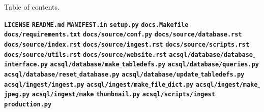 \documentclass[10pt,journal,compsoc]{IEEEtran}
\begin{document}
Table of contents.

\noindent\textbf{\texttt{LICENSE}}\lstset{style=code}
\textbf{\texttt{README.md}}\lstset{style=code}
\textbf{\texttt{MANIFEST.in}}\lstset{style=code}
\textbf{\texttt{setup.py}}\lstset{style=code}
\textbf{\texttt{docs.Makefile}}\lstset{style=code}
\textbf{\texttt{docs/requirements.txt}}\lstset{style=code}
\newpage
\textbf{\texttt{docs/source/conf.py}}\lstset{style=code}
\textbf{\texttt{docs/source/database.rst}}\lstset{style=code}
\textbf{\texttt{docs/source/index.rst}}\lstset{style=code}
\textbf{\texttt{docs/source/ingest.rst}}\lstset{style=code}
\textbf{\texttt{docs/source/scripts.rst}}\lstset{style=code}
\textbf{\texttt{docs/source/utils.rst}}\lstset{style=code}
\textbf{\texttt{docs/source/website.rst}}\lstset{style=code}
\textbf{\texttt{acsql/database/database$\_$interface.py}}\lstset{style=code}
\textbf{\texttt{acsql/database/make$\_$tabledefs.py}}\lstset{style=code}
\textbf{\texttt{acsql/database/queries.py}}\lstset{style=code}
\textbf{\texttt{acsql/database/reset$\_$database.py}}\lstset{style=code}
\textbf{\texttt{acsql/database/update$\_$tabledefs.py}}\lstset{style=code}
\textbf{\texttt{acsql/ingest/ingest.py}\lstset{style=code}}
\textbf{\texttt{acsql/ingest/make$\_$file$\_$dict.py}}\lstset{style=code}
\textbf{\texttt{acsql/ingest/make$\_$jpeg.py}}\lstset{style=code}
\textbf{\texttt{acsql/ingest/make$\_$thumbnail.py}}\lstset{style=code}
\newpage
\textbf{\texttt{acsql/scripts/ingest$\_$production.py}}\lstset{style=code}
\end{document}
